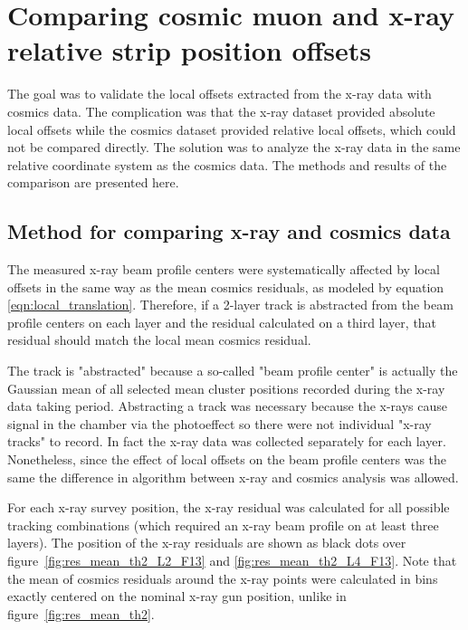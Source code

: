 
\chapter{Comparing cosmic muon and x-ray relative strip position offsets}
\label{chap:comparison}

The goal was to validate the local offsets extracted from the x-ray data with cosmics data. The complication was that the x-ray dataset provided absolute local offsets while the cosmics dataset provided relative local offsets, which could not be compared directly. The solution was to analyze the x-ray data in the same relative coordinate system as the cosmics data. The methods and results of the comparison are presented here.

\section{Method for comparing x-ray and cosmics data}

The measured x-ray beam profile centers were systematically affected by local offsets in the same way as the mean cosmics residuals, as modeled by equation \ref{eqn:local_translation}. Therefore, if a 2-layer track is abstracted from the beam profile centers on each layer and the residual calculated on a third layer, that residual should match the local mean cosmics residual. 

The track is "abstracted" because a so-called "beam profile center" is actually the Gaussian mean of all selected mean cluster positions recorded during the x-ray data taking period. Abstracting a track was necessary because the x-rays cause signal in the chamber via the photoeffect so there were not individual "x-ray tracks" to record. In fact the x-ray data was collected separately for each layer. Nonetheless, since the effect of local offsets on the beam profile centers was the same the difference in algorithm between x-ray and cosmics analysis was allowed. 

For each x-ray survey position, the x-ray residual was calculated for all possible tracking combinations (which required an x-ray beam profile on at least three layers). The position of the x-ray residuals are shown as black dots over figure~\ref{fig:res_mean_th2_L2_F13} and \ref{fig:res_mean_th2_L4_F13}. Note that the mean of cosmics residuals around the x-ray points were calculated in bins exactly centered on the nominal x-ray gun position, unlike in figure~\ref{fig:res_mean_th2}.

